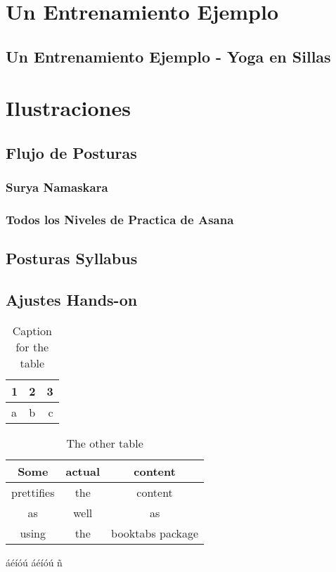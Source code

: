 \documentclass[11pt]{book}
\begin{document}
\chapter{Un Entrenamiento Ejemplo}
\section{Un Entrenamiento Ejemplo - Yoga en Sillas}

\chapter{Ilustraciones}
\section{Flujo de Posturas}
\subsection{Surya Namaskara}
\subsection{Todos los Niveles de Practica de Asana}
\section{Posturas Syllabus}
\section{Ajustes Hands-on}


\begin{table}[h!]
	\centering
	\begin{tabular}{l|c||r}
		1 & 2 & 3\\
		\hline
		a & b & c\\
	\end{tabular}
	\caption{Caption for the table}
	\label{tab:table}
\end{table}


\begin{table}[h!]
	\centering
	\begin{tabular}{ccc}
		\toprule
		Some & actual & content\\
		\midrule
		prettifies & the & content\\
		as & well & as \\
		using & the & booktabs package\\
		\bottomrule
	\end{tabular}
	\caption{The other table}
	\label{tab:table2}
\end{table}

\newpage
áéíóú
\'a\'e\'i\'o\'u
ñ
\end{document}
